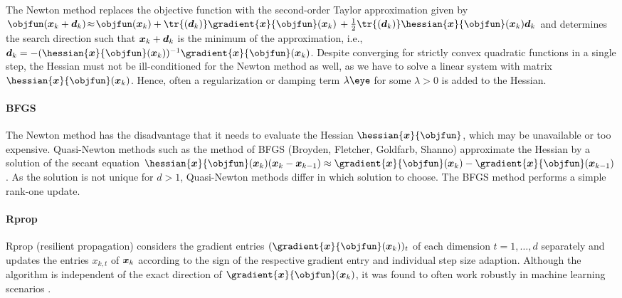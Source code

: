 The Newton method
replaces the objective function with the second-order Taylor approximation
given by
$\objfun(\*x_k + \*d_k)
\!\approx\! \objfun(\*x_k) +
\tr{(\*d_k)} \gradient{\*x}{\objfun}(\*x_k) \,+
\frac{1}{2} \tr{(\*d_k)} \hessian{\*x}{\objfun}(\*x_k) \*d_k$
and determines the search direction such that ${\boldsymbol{x}}_k + {\boldsymbol{d}}_k$ is
the minimum of the approximation, i.e.,
$\*d_k = -(\hessian{\*x}{\objfun}(\*x_k))^{-1} \gradient{\*x}{\objfun}(\*x_k)$.
Despite converging for strictly convex quadratic functions in a single step,
the Hessian must not be ill-conditioned for the Newton method as well,
as we have to solve a linear system with matrix
$\hessian{\*x}{\objfun}(\*x_k)$.
Hence, often a regularization or damping term $\lambda \eye$
for some $\lambda > 0$ is added to the Hessian.

\paragraph{BFGS}

The Newton method has the disadvantage that it needs to evaluate the
Hessian $\hessian{\*x}{\objfun}$,
which may be unavailable or too expensive.
Quasi-Newton methods such as the method of BFGS
(Broyden, Fletcher, Goldfarb, Shanno)
approximate the Hessian by a solution of the secant equation
$\hessian{\*x}{\objfun}(\*x_k) (\*x_k - \*x_{k-1}) \approx
\gradient{\*x}{\objfun}(\*x_k) - \gradient{\*x}{\objfun}(\*x_{k-1})$.
As the solution is not unique for $d > 1$,
Quasi-Newton methods differ in which solution to choose.
The BFGS method performs a simple rank-one update.

\paragraph{Rprop}

Rprop (resilient propagation)
considers the gradient entries $(\gradient{\*x}{\objfun}(\*x_k))_t$
of each dimension $t = 1, \dotsc, d$ separately
and updates the entries $x_{k,t}$ of ${\boldsymbol{x}}_k$
according to the sign of the respective gradient entry and
individual step size adaption.
Although the algorithm is independent of the exact direction
of $\gradient{\*x}{\objfun}(\*x_k)$,
it was found to often work robustly in machine learning scenarios
\cite{Toussaint15Introduction}.

